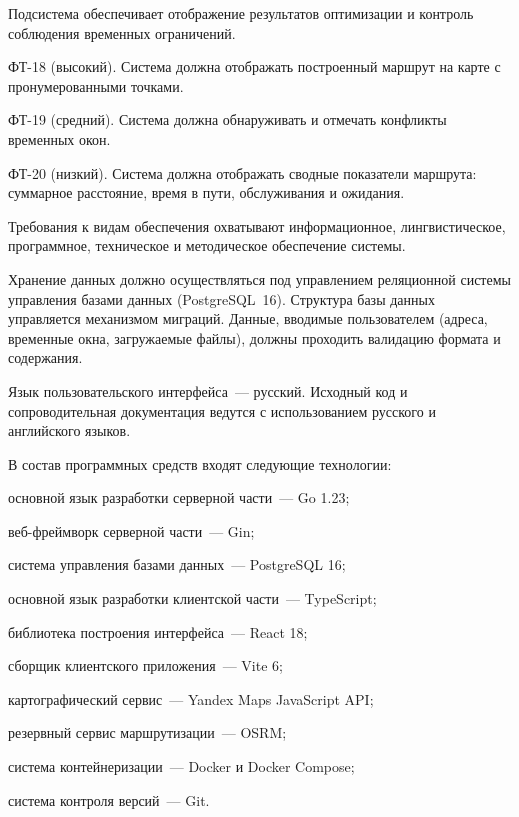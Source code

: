 Подсистема обеспечивает отображение результатов оптимизации и контроль соблюдения
временных ограничений.
\begin{compactlistdot}
  \item ФТ-18 (высокий). Система должна отображать построенный маршрут на карте с пронумерованными точками.
  \item ФТ-19 (средний). Система должна обнаруживать и отмечать конфликты временных окон.
  \item ФТ-20 (низкий). Система должна отображать сводные показатели маршрута: суммарное расстояние, время в пути, обслуживания и ожидания.
\end{compactlistdot}

Требования к видам обеспечения охватывают информационное, лингвистическое, программное,
техническое и методическое обеспечение системы.

Хранение данных должно осуществляться под управлением реляционной системы управления
базами данных (PostgreSQL~16). Структура базы данных управляется механизмом миграций.
Данные, вводимые пользователем (адреса, временные окна, загружаемые файлы), должны
проходить валидацию формата и содержания.

Язык пользовательского интерфейса~--- русский. Исходный код и сопроводительная
документация ведутся с использованием русского и английского языков.

В состав программных средств входят следующие технологии:
\begin{compactlist}
  \item основной язык разработки серверной части~--- Go 1.23;
  \item веб-фреймворк серверной части~--- Gin;
  \item система управления базами данных~--- PostgreSQL 16;
  \item основной язык разработки клиентской части~--- TypeScript;
  \item библиотека построения интерфейса~--- React 18;
  \item сборщик клиентского приложения~--- Vite 6;
  \item картографический сервис~--- Yandex Maps JavaScript API;
  \item резервный сервис маршрутизации~--- OSRM;
  \item система контейнеризации~--- Docker и Docker Compose;
  \item система контроля версий~--- Git.
\end{compactlist}

